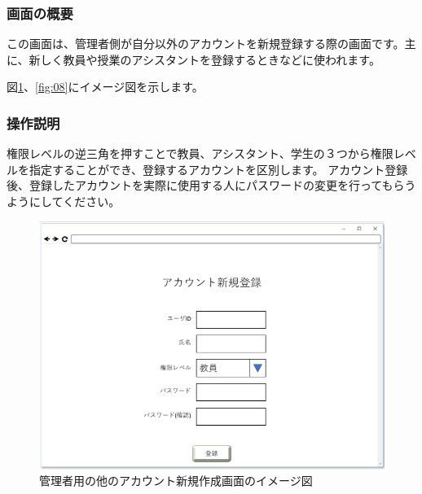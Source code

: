 \subsubsection{画面の概要}
この画面は、管理者側が自分以外のアカウントを新規登録する際の画面です。主に、新しく教員や授業のアシスタントを登録するときなどに使われます。

図\ref{fig:07}、\ref{fig:08}にイメージ図を示します。

\subsubsection{操作説明}
権限レベルの逆三角を押すことで教員、アシスタント、学生の３つから権限レベルを指定することができ、登録するアカウントを区別します。
アカウント登録後、登録したアカウントを実際に使用する人にパスワードの変更を行ってもらうようにしてください。

\begin{figure}[phtbp]
  \begin{center}
    \includegraphics[width=1\linewidth,clip]{./img/07.png}
    \caption{管理者用の他のアカウント新規作成画面のイメージ図}\label{fig:07}
  \end{center}
\end{figure}

